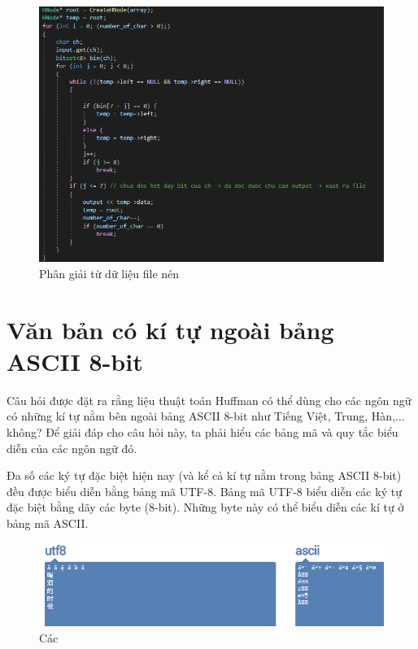 \documentclass[14pt]{extreport}
\begin{document}
\begin{center}
    \begin{figure}[H]
    \begin{center}
     \includegraphics[scale=0.8]{decode_2.PNG}
    \end{center}
    \caption{Phân giải từ dữ liệu file nén}
    \label{refhinh1}
    \end{figure}
\end{center}
\section{Văn bản có kí tự ngoài bảng ASCII 8-bit}
Câu hỏi được đặt ra rằng liệu thuật toán Huffman có thể dùng cho các ngôn ngữ có những kí tự nằm bên ngoài bảng ASCII 8-bit như Tiếng Việt, Trung, Hàn,... không? Để giải đáp cho câu hỏi này, ta phải hiểu các bảng mã và quy tắc biểu diễn của các ngôn ngữ đó.

Đa số các ký tự đặc biệt hiện nay (và kể cả kí tự nằm trong bảng ASCII 8-bit) đều được biểu diễn bằng bảng mã UTF-8. Bảng mã UTF-8 biểu diễn các ký tự đặc biệt bằng dãy các byte (8-bit). Những byte này có thể biểu diễn các kí tự ở bảng mã ASCII.

\begin{center}
    \begin{figure}[H]
    \begin{center}
     \includegraphics[scale=0.9]{utf8_ascii.PNG}
    \end{center}
    \caption{Các }
    \label{refhinh1}
    \end{figure}
\end{center}
\end{document}
